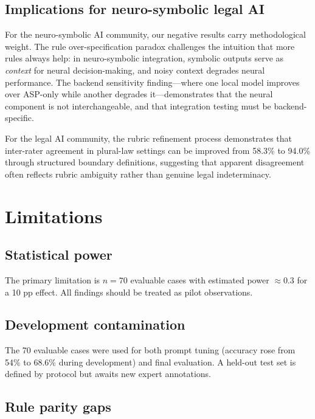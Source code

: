 \documentclass[pdflatex,sn-basic,Numbered]{sn-jnl}
\begin{document}
\subsection{Implications for neuro-symbolic legal AI}\label{subsec:disc-implications}

For the neuro-symbolic AI community, our negative results carry methodological weight.
The rule over-specification paradox challenges the intuition that more rules always help: in neuro-symbolic integration, symbolic outputs serve as \textit{context} for neural decision-making, and noisy context degrades neural performance.
The backend sensitivity finding---where one local model improves over ASP-only while another degrades it---demonstrates that the neural component is not interchangeable, and that integration testing must be backend-specific.

For the legal AI community, the rubric refinement process demonstrates that inter-rater agreement in plural-law settings can be improved from 58.3\% to 94.0\% through structured boundary definitions, suggesting that apparent disagreement often reflects rubric ambiguity rather than genuine legal indeterminacy.

\section{Limitations}\label{sec:limitations}

\subsection{Statistical power}\label{subsec:lim-power}

The primary limitation is $n=70$ evaluable cases with estimated power $\approx 0.3$ for a 10 pp effect.
All findings should be treated as pilot observations.

\subsection{Development contamination}\label{subsec:lim-contam}

The 70 evaluable cases were used for both prompt tuning (accuracy rose from 54\% to 68.6\% during development) and final evaluation.
A held-out test set is defined by protocol but awaits new expert annotations.

\subsection{Rule parity gaps}\label{subsec:lim-parity}
\end{document}
